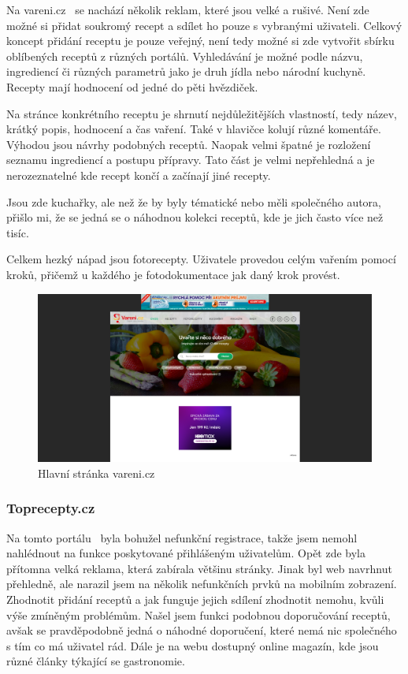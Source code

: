 Na vareni.cz~\cite{VareniCZ} se nachází několik reklam, které jsou velké a rušivé. Není zde možné si přidat soukromý recept a sdílet ho
pouze s vybranými uživateli. Celkový koncept přidání receptu je pouze veřejný, není tedy možné si zde vytvořit sbírku
oblíbených receptů z různých portálů. Vyhledávání je možné podle názvu, ingrediencí či různých parametrů jako je druh jídla
nebo národní kuchyně. Recepty mají hodnocení od jedné do pěti hvězdiček.

Na stránce konkrétního receptu je shrnutí nejdůležitějších vlastností, tedy název, krátký popis, hodnocení a čas vaření.
Také v hlavičce kolují různé komentáře. Výhodou jsou návrhy podobných receptů. Naopak velmi špatné je rozložení seznamu ingrediencí
a postupu přípravy. Tato část je velmi nepřehledná a je nerozeznatelné kde recept končí a začínají jiné recepty.

Jsou zde kuchařky, ale než že by byly tématické nebo měli společného autora, přišlo mi, že se jedná se o náhodnou kolekci receptů,
kde je jich často více než tisíc.

Celkem hezký nápad jsou fotorecepty. Uživatele provedou celým vařením pomocí kroků, přičemž u každého je fotodokumentace jak daný krok
provést.

\begin{figure}[H]
    \includegraphics[width=\textwidth]{images/varenicz-uvodni-stranka}
    \caption{Hlavní stránka vareni.cz} \label{picture:varenicz:uvodni-stranka}
\end{figure}

\subsubsection{Toprecepty.cz}

Na tomto portálu~\cite{TopreceptyCZ} byla bohužel nefunkční registrace, takže jsem nemohl nahlédnout na funkce poskytované přihlášeným
uživatelům. Opět zde byla přítomna velká reklama, která zabírala většinu stránky. Jinak byl web navrhnut přehledně,
ale narazil jsem na několik nefunkčních prvků na mobilním zobrazení. Zhodnotit přidání receptů a jak funguje jejich
sdílení zhodnotit nemohu, kvůli výše zmíněným problémům. Našel jsem funkci podobnou doporučování receptů, avšak se
pravděpodobně jedná o náhodné doporučení, které nemá nic společného s tím co má uživatel rád. Dále je na webu dostupný
online magazín, kde jsou různé články týkající se gastronomie.

